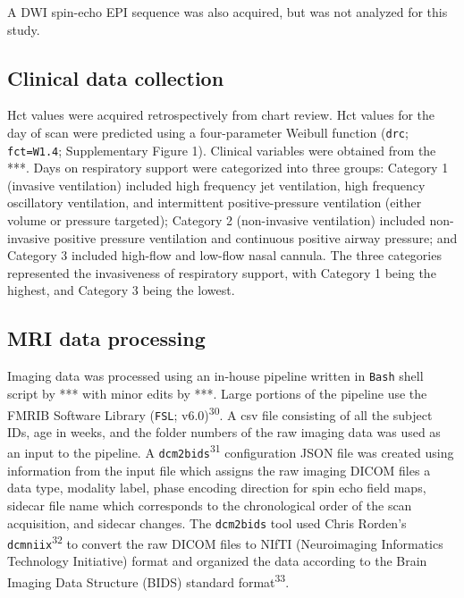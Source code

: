 \documentclass[
  letterpaper,
  DIV=11,
  numbers=noendperiod]{scrartcl}
\begin{document}
A DWI spin-echo EPI sequence was also acquired, but was not analyzed for
this study.

\subsection{Clinical data collection}\label{clinical-data-collection}

Hct values were acquired retrospectively from chart review. Hct values
for the day of scan were predicted using a four-parameter Weibull
function (\texttt{drc}; \texttt{fct=W1.4}; Supplementary Figure 1).
Clinical variables were obtained from the ***. Days on respiratory
support were categorized into three groups: Category 1 (invasive
ventilation) included high frequency jet ventilation, high frequency
oscillatory ventilation, and intermittent positive-pressure ventilation
(either volume or pressure targeted); Category 2 (non-invasive
ventilation) included non-invasive positive pressure ventilation and
continuous positive airway pressure; and Category 3 included high-flow
and low-flow nasal cannula. The three categories represented the
invasiveness of respiratory support, with Category 1 being the highest,
and Category 3 being the lowest.

\subsection{MRI data processing}\label{mri-data-processing}

Imaging data was processed using an in-house pipeline written in
\texttt{Bash} shell script by *** with minor edits by ***. Large
portions of the pipeline use the FMRIB Software Library (\texttt{FSL};
v6.0)\textsuperscript{30}. A csv file consisting of all the subject IDs,
age in weeks, and the folder numbers of the raw imaging data was used as
an input to the pipeline. A \texttt{dcm2bids}\textsuperscript{31}
configuration JSON file was created using information from the input
file which assigns the raw imaging DICOM files a data type, modality
label, phase encoding direction for spin echo field maps, sidecar file
name which corresponds to the chronological order of the scan
acquisition, and sidecar changes. The \texttt{dcm2bids} tool used Chris
Rorden's \texttt{dcmniix}\textsuperscript{32} to convert the raw DICOM
files to NIfTI (Neuroimaging Informatics Technology Initiative) format
and organized the data according to the Brain Imaging Data Structure
(BIDS) standard format\textsuperscript{33}.
\end{document}
